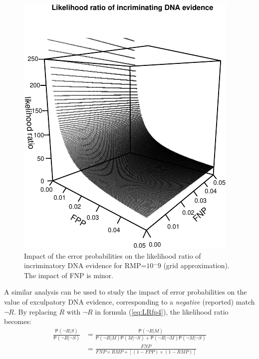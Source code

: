 \documentclass[
  10pt,
  dvipsnames,enabledeprecatedfontcommands]{scrartcl}
\newcommand{\n}{\neg}
\newcommand{\pr}[1]{\mathsf{P}(#1)}
\begin{document}
\begin{figure}

\begin{center}\includegraphics[width=1\linewidth]{lr-chapter6_files/figure-latex/fig-fpplr-1} \end{center}
\caption{Impact of the error probabilities on the likelihood ratio of incriminatory DNA evidence for \mbox{RMP=$10{^-9}$} (grid approximation). The impact of FNP is  minor.}
\label{fig:fpplr}
\end{figure}

A similar analysis can be used to study the impact of error
probabilities on the value of exculpatory DNA evidence, corresponding to
a \textit{negative} (reported) match \(\neg R\). By replacing \(R\) with
\(\neg R\) in formula (\ref{eq:LRfp4}), the likelihood ratio becomes:
\begin{align}
\label{eq:LR-match-exc}
\frac{\pr{\neg R \vert S}}{\pr{\neg R \vert \neg S}} & = 
\frac{\pr{\neg R \vert M}}{\pr{\neg R \vert M }\pr{M \vert \n S} + \pr{\neg R \vert \n M}\pr{\n M \vert \n S}}\\
& = \frac{FNP}{FNP\times RMP + [(1-FPP) \times (1-RMP)]}
\end{align}
\end{document}
